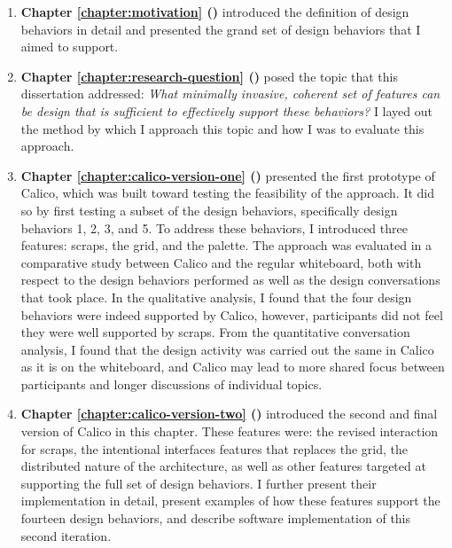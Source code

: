 \documentclass[12pt,fleqn]{ucithesis}
\begin{document}
 \begin{enumerate}

   \item \textbf{Chapter \ref{chapter:motivation} ()} introduced the definition of design behaviors in detail and presented the grand set of design behaviors that I aimed to support. 

   \item \textbf{Chapter \ref{chapter:research-question} ()} posed the topic that this dissertation addressed: \textit{What minimally invasive, coherent set of features can be design that is sufficient to effectively support these behaviors?} I layed out the method by which I approach this topic and how I was to evaluate this approach.

   \item \textbf{Chapter \ref{chapter:calico-version-one} ()} presented the first prototype of Calico, which was built toward testing the feasibility of the approach. It did so by first testing a subset of the design behaviors, specifically design behaviors 1, 2, 3, and 5. To address these behaviors, I introduced three features: scraps, the grid, and the palette. The approach was evaluated in a comparative study between Calico and the regular whiteboard, both with respect to the design behaviors performed as well as the design conversations that took place. In the qualitative analysis, I found that the four design behaviors were indeed supported by Calico, however, participants did not feel they were well supported by scraps. From the quantitative conversation analysis, I found that the design activity was carried out the same in Calico as it is on the whiteboard, and Calico may lead to more shared focus between participants and longer discussions of individual topics.

   \item \textbf{Chapter \ref{chapter:calico-version-two} ()} introduced the second and final version of Calico in this chapter. These features were: the revised interaction for scraps, the intentional interfaces features that replaces the grid, the distributed nature of the architecture, as well as other features targeted at supporting the full set of design behaviors. I further present their implementation in detail, present examples of how these features support the fourteen design behaviors, and describe software implementation of this second iteration.


\end{enumerate}
\end{document}
